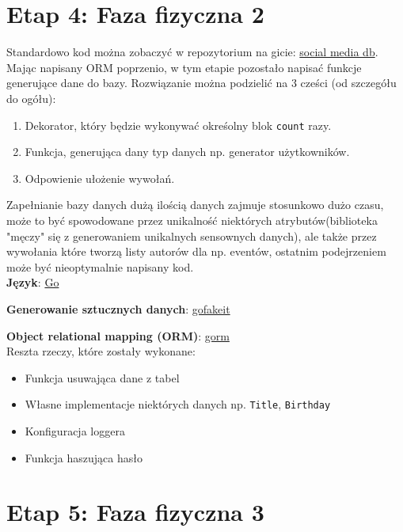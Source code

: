 \documentclass{article}
\begin{document}
\section{Etap 4: Faza fizyczna 2}

\quad Standardowo kod można zobaczyć w repozytorium na gicie: \href{https://github.com/lukaszfabia/social_media_db}{social media db}. \\

\quad Mając napisany ORM poprzenio, w tym etapie pozostało napisać funkcje generujące dane do bazy. Rozwiązanie można podzielić na 3 cześci (od szczegółu do ogółu):

\begin{enumerate}
    \item Dekorator, który będzie wykonywać okreśolny blok \texttt{count} razy.
    \item Funkcja, generująca dany typ danych np. generator użytkowników.
    \item Odpowienie ułożenie wywołań.
\end{enumerate}

Zapełnianie bazy danych dużą ilością danych zajmuje stosunkowo dużo czasu, może to być spowodowane przez unikalność niektórych atrybutów(biblioteka "męczy" się z generowaniem unikalnych sensownych danych), ale także przez wywołania które tworzą listy autorów dla np. eventów, ostatnim podejrzeniem może być nieoptymalnie napisany kod. \\


\textbf{Język}: \href{https://go.dev/}{Go}

\textbf{Generowanie sztucznych danych}: \href{https://github.com/brianvoe/gofakeit}{gofakeit}

\textbf{Object relational mapping (ORM)}: \href{https://github.com/go-gorm/gorm}{gorm} \\

Reszta rzeczy, które zostały wykonane:

\begin{itemize}
    \item Funkcja usuwająca dane z tabel
    \item Własne implementacje niektórych danych np. \texttt{Title}, \texttt{Birthday}
    \item Konfiguracja loggera
    \item Funkcja haszująca hasło
\end{itemize}

\section{Etap 5: Faza fizyczna 3}
\end{document}
